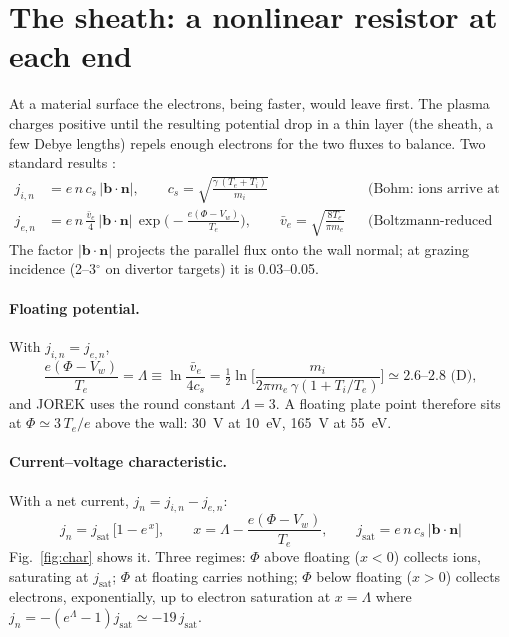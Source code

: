 \documentclass[11pt,a4paper]{article}
\newcommand{\bn}{\mathbf{n}}
\newcommand{\bb}{\mathbf{b}}
\newcommand{\Te}{T_e}
\newcommand{\Ti}{T_i}
\newcommand{\cs}{c_s}
\newcommand{\jsat}{j_{\mathrm{sat}}}
\begin{document}
\section{The sheath: a nonlinear resistor at each end}

At a material surface the electrons, being faster, would leave first. The plasma charges positive until the resulting
potential drop in a thin layer (the sheath, a few Debye lengths) repels enough electrons for the two fluxes to balance.
Two standard results \cite{stangeby}:
\begin{align}
  j_{i,n} &= e\,n\,\cs\,|\bb\cdot\bn|, \qquad \cs = \sqrt{\frac{\gamma\,(\Te+\Ti)}{m_i}} &&\text{(Bohm: ions arrive at the sound speed)}
  \label{eq:ji}\\
  j_{e,n} &= e\,n\,\frac{\bar v_e}{4}\,|\bb\cdot\bn|\,\exp\!\Big(-\frac{e(\Phi - V_w)}{\Te}\Big), \qquad
  \bar v_e = \sqrt{\frac{8\Te}{\pi m_e}} &&\text{(Boltzmann-reduced electron flux)}
  \label{eq:je}
\end{align}
The factor $|\bb\cdot\bn|$ projects the parallel flux onto the wall normal; at grazing incidence (2--3$^\circ$ on
divertor targets) it is 0.03--0.05.

\paragraph{Floating potential.} With $j_{i,n} = j_{e,n}$,
\begin{equation}
  \frac{e(\Phi - V_w)}{\Te} = \Lambda \equiv \ln\frac{\bar v_e}{4\cs}
  = \tfrac12\ln\!\Big[\frac{m_i}{2\pi m_e\,\gamma(1+\Ti/\Te)}\Big] \simeq 2.6\text{--}2.8 \text{ (D)},
  \label{eq:lambda}
\end{equation}
and JOREK uses the round constant $\Lambda = 3$. A floating plate point therefore sits at $\Phi \simeq 3\,\Te/e$ above
the wall: 30~V at 10~eV, 165~V at 55~eV.

\paragraph{Current--voltage characteristic.} With a net current, $j_n = j_{i,n} - j_{e,n}$:
\begin{equation}
  \boxed{\;j_n = \jsat\,\big[1 - e^{\,x}\big],\qquad x = \Lambda - \frac{e(\Phi-V_w)}{\Te},\qquad
  \jsat = e\,n\,\cs\,|\bb\cdot\bn| \;}
  \label{eq:char}
\end{equation}
Fig.~\ref{fig:char} shows it. Three regimes: $\Phi$ above floating ($x<0$) collects ions, saturating at $\jsat$;
$\Phi$ at floating carries nothing; $\Phi$ below floating ($x>0$) collects electrons, exponentially, up to electron
saturation at $x = \Lambda$ where $j_n = -(e^\Lambda - 1)\jsat \simeq -19\,\jsat$.
\end{document}
